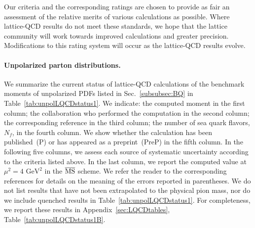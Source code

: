 Our criteria and the corresponding ratings are chosen to provide as fair an assessment of the relative merits of various calculations as possible.
%
Where lattice-QCD results do not meet these standards, we hope that the lattice community will work towards improved calculations and greater precision.
%
Modifications to this rating system will occur as the lattice-QCD results evolve.

\paragraph{Unpolarized parton distributions.}
We summarize the current status of lattice-QCD calculations of the benchmark 
moments of unpolarized PDFs listed in Sec.~\ref{subsubsec:BQ} in 
Table~\ref{tab:unpolLQCDstatus1}. 
%
We indicate: the computed moment in the first column; the collaboration who
performed the computation in the second column; the corresponding reference
in the third column; the number of sea quark flavors, $N_f$, in the fourth 
column.
%
We show whether the calculation has been published~(P) 
or has appeared as a preprint~(PreP) in the fifth column.
%
In the following five columns, we assess each source of systematic uncertainty
according to the criteria listed above. 
%
In the last column, we report the computed value at $\mu^2=4\mbox{ GeV}^2$
in the $\overline{{\rm MS}}$ scheme.
%
We refer the reader to the corresponding references for details on the 
meaning of the errors reported in parentheses.
%
We do not list results that have not been extrapolated to the physical pion 
mass, nor do we include quenched results in Table~\ref{tab:unpolLQCDstatus1}. 
%
For completeness, we report these results in  Appendix~\ref{sec:LQCDtables},
Table~\ref{tab:unpolLQCDstatus1B}.

